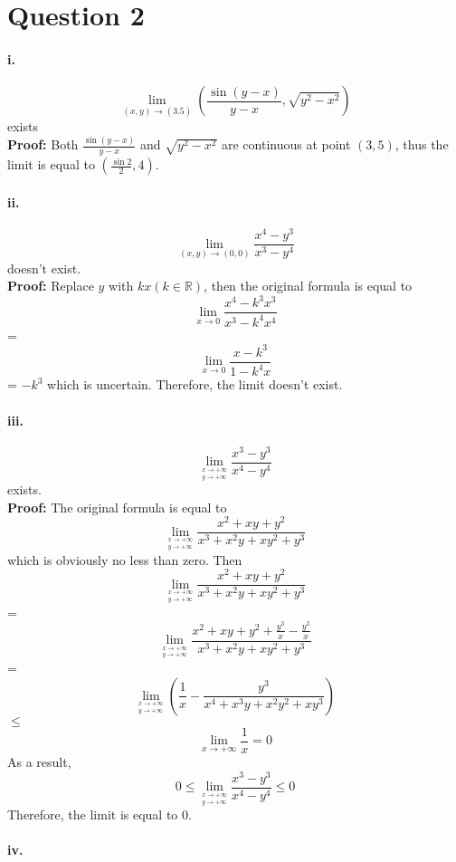 \documentclass[11pt, a4paper]{article}
\begin{document}
\section*{Question 2}

\paragraph{i.}
$$\lim_{(x, y) \to (3.5)} (\frac{\sin (y - x)}{y - x}, \sqrt{y ^ 2 - x ^ 2})$$ exists \\
\textbf{Proof:} Both $\frac{\sin (y - x)}{y - x}$ and $\sqrt{y ^ 2 - x ^ 2}$ are continuous at point $(3, 5)$, thus the limit is equal to $(\frac{\sin 2}{2}, 4)$.

\paragraph{ii.}
$$\lim_{(x, y) \to (0, 0)} \frac{x ^ 4 - y ^ 3}{x ^ 3 - y ^ 4}$$ doesn't exist. \\
\textbf{Proof:} Replace $y$ with $kx (k \in \mathbb{R})$, then the original formula is equal to $$\lim_{x \to 0} \frac{x ^ 4 - k ^ 3 x ^ 3}{x ^ 3 - k ^ 4 x ^ 4}$$ = $$\lim_{x \to 0} \frac{x - k ^ 3}{1 - k ^ 4 x}$$ = $-k ^ 3$ which is uncertain. Therefore, the limit doesn't exist.

\paragraph{iii.}
$$\lim\limits_{^{x \to +\infty}_{y \to +\infty}} \frac{x ^ 3 - y ^ 3}{x ^ 4 - y ^ 4}$$ exists. \\
\textbf{Proof:} The original formula is equal to 
$$\lim\limits_{^{x \to +\infty}_{y \to +\infty}} \frac{x ^ 2 + xy + y ^ 2}{x ^ 3 + x ^ 2 y + x y ^ 2 + y ^ 3}$$ which is obviously no less than zero. Then
$$\lim\limits_{^{x \to +\infty}_{y \to +\infty}} \frac{x ^ 2 + xy + y ^ 2}{x ^ 3 + x ^ 2 y + x y ^ 2 + y ^ 3}$$ = 
$$\lim\limits_{^{x \to +\infty}_{y \to +\infty}} \frac{x ^ 2 + xy + y ^ 2 + \frac{y ^ 3}{x} - \frac{y ^3}{x}}{x ^ 3 + x ^ 2 y + x y ^ 2 + y ^ 3}$$ = 
$$\lim\limits_{^{x \to +\infty}_{y \to +\infty}} (\frac{1}{x} - \frac{y ^ 3}{x ^ 4 + x ^ 3 y + x ^ 2 y ^ 2 + x y ^ 3}) $$ $\leq $
$$\lim_{x \to +\infty} \frac{1}{x} = 0$$
As a result, 
$$0 \leq \lim\limits_{^{x \to +\infty}_{y \to +\infty}} \frac{x ^ 3 - y ^ 3}{x ^ 4 - y ^ 4} \leq 0$$
Therefore, the limit is equal to 0.

\paragraph{iv.}
\end{document}
